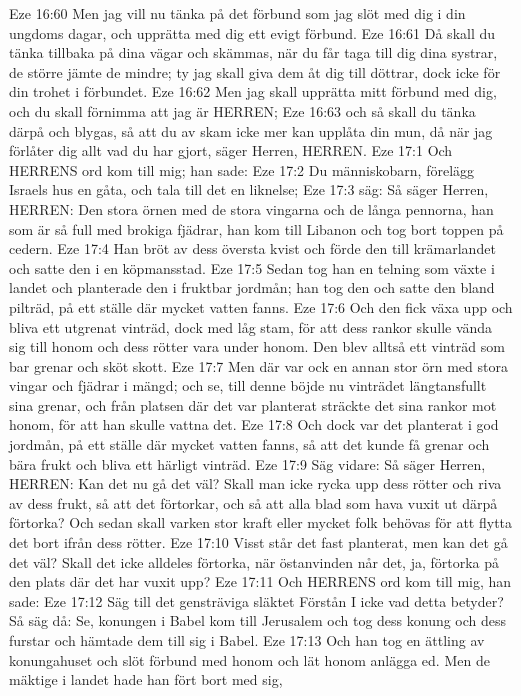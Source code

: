 Eze 16:60  Men jag vill nu tänka på det förbund som jag slöt med dig i din ungdoms dagar, och upprätta med dig ett evigt förbund.
Eze 16:61  Då skall du tänka tillbaka på dina vägar och skämmas, när du får taga till dig dina systrar, de större jämte de mindre; ty jag skall giva dem åt dig till döttrar, dock icke för din trohet i förbundet.
Eze 16:62  Men jag skall upprätta mitt förbund med dig, och du skall förnimma att jag är HERREN;
Eze 16:63  och så skall du tänka därpå och blygas, så att du av skam icke mer kan upplåta din mun, då när jag förlåter dig allt vad du har gjort, säger Herren, HERREN.
Eze 17:1  Och HERRENS ord kom till mig; han sade:
Eze 17:2  Du människobarn, förelägg Israels hus en gåta, och tala till det en liknelse;
Eze 17:3  säg: Så säger Herren, HERREN: Den stora örnen med de stora vingarna och de långa pennorna, han som är så full med brokiga fjädrar, han kom till Libanon och tog bort toppen på cedern.
Eze 17:4  Han bröt av dess översta kvist och förde den till krämarlandet och satte den i en köpmansstad.
Eze 17:5  Sedan tog han en telning som växte i landet och planterade den i fruktbar jordmån; han tog den och satte den bland pilträd, på ett ställe där mycket vatten fanns.
Eze 17:6  Och den fick växa upp och bliva ett utgrenat vinträd, dock med låg stam, för att dess rankor skulle vända sig till honom och dess rötter vara under honom. Den blev alltså ett vinträd som bar grenar och sköt skott.
Eze 17:7  Men där var ock en annan stor örn med stora vingar och fjädrar i mängd; och se, till denne böjde nu vinträdet längtansfullt sina grenar, och från platsen där det var planterat sträckte det sina rankor mot honom, för att han skulle vattna det.
Eze 17:8  Och dock var det planterat i god jordmån, på ett ställe där mycket vatten fanns, så att det kunde få grenar och bära frukt och bliva ett härligt vinträd.
Eze 17:9  Säg vidare: Så säger Herren, HERREN: Kan det nu gå det väl? Skall man icke rycka upp dess rötter och riva av dess frukt, så att det förtorkar, och så att alla blad som hava vuxit ut därpå förtorka? Och sedan skall varken stor kraft eller mycket folk behövas för att flytta det bort ifrån dess rötter.
Eze 17:10  Visst står det fast planterat, men kan det gå det väl? Skall det icke alldeles förtorka, när östanvinden når det, ja, förtorka på den plats där det har vuxit upp?
Eze 17:11  Och HERRENS ord kom till mig, han sade:
Eze 17:12  Säg till det gensträviga släktet Förstån I icke vad detta betyder? Så säg då: Se, konungen i Babel kom till Jerusalem och tog dess konung och dess furstar och hämtade dem till sig i Babel.
Eze 17:13  Och han tog en ättling av konungahuset och slöt förbund med honom och lät honom anlägga ed. Men de mäktige i landet hade han fört bort med sig,
